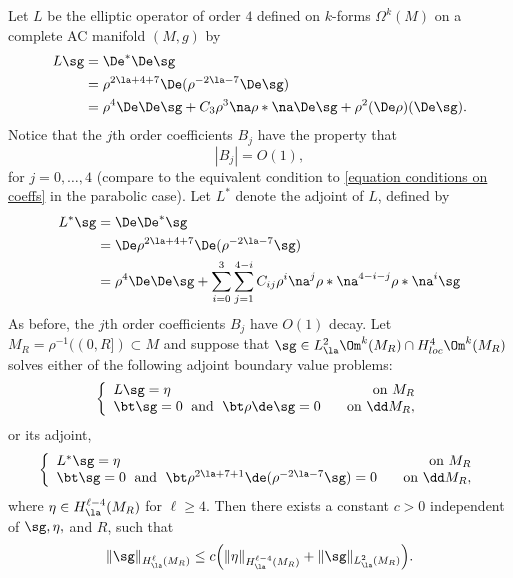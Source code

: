 \documentclass[hidelinks, 12pt, oneside, reqno]{amsart}
\begin{document}
\begin{prop}\label{proposition lopatinski shapiro condition}
Let $L$ be the elliptic operator of order $4$ defined on $k$-forms $\Omega^k(M)$ on a complete AC manifold $(M,g)$ by
\begin{align*}
    L\sg &= \De^*\De \sg \\
        &= \rho^{2\la + 4 + 7}\De (\rho^{-2\la -7} \De \sg) \\
        &= \rho^{4}\De \De \sg + C_3 \rho^{3} \na \rho * \na \De \sg + \rho^{2} (\De \rho )(\De \sg).
\end{align*}
Notice that the $j$th order coefficients $B_j$ have the property that
\begin{equation}\label{equation growth of coefficients}
|B_j| = O(1),
\end{equation}
for $j = 0, \ldots, 4$ (compare to the equivalent condition to \eqref{equation conditions on coeffs} in the parabolic case). Let $L^*$ denote the adjoint of $L$, defined by
\begin{align*}
    L^*\sg &= \De\De^* \sg \\
        &= \De \rho^{2\la + 4 + 7}\De (\rho^{-2\la -7} \sg) \\
        &= \rho^{4}\De \De \sg + \sum_{i=0}^3 \sum_{j=1}^{4-i} C_{ij} \rho^i \na^j \rho * \na^{4-i-j} \rho * \na^i \sg
\end{align*}
As before, the $j$th order coefficients $B_j$ have $O(1)$ decay. Let $M_R = \rho^{-1}((0,R]) \subset M$ and suppose that $\sg \in L^2_{\la}\Om^k(M_R) \cap H^4_{loc} \Om^k(M_R)$ solves either of the following adjoint boundary value problems: 
\begin{equation}\label{equation fourth order bvp with LS}
    \left\{
\begin{array}{lr}
L\sg = \eta   & \;\; \text{ on } M_R\\ 
\bt \sg = 0 \;\text{ and }\; \bt \rho \de \sg = 0 & \;\; \text{ on } \dd M_R,
\end{array}
\right.
\end{equation}
or its adjoint,
\begin{equation}\label{equation fourth order bvp with LS adjoint}
    \left\{
\begin{array}{lr}
L^*\sg = \eta   & \;\; \text{ on } M_R\\ 
\bt \sg = 0 \;\text{ and }\; \bt \rho^{2\la + 7 + 1} \de (\rho^{-2\la -7} \sg) = 0 & \;\; \text{ on } \dd M_R,
\end{array}
\right.
\end{equation}
where $\eta \in H_{\la}^{\ell-4}(M_R)$ for $\ell \ge 4$.
Then there exists a constant $c >0$ independent of $\sg, \eta,$ and $R$, such that
    \begin{equation}\label{equation schauder estimates forms with lopatinski shapiro}
        \|\sg\|_{H^{\ell}_{\la}(M_R)} \le c\Big(\|\eta\|_{H^{\ell-4}_{\la}(M_R)} + \|\sg\|_{L^2_{\la}(M_R)} \Big).
    \end{equation}
\end{prop}
\end{document}
